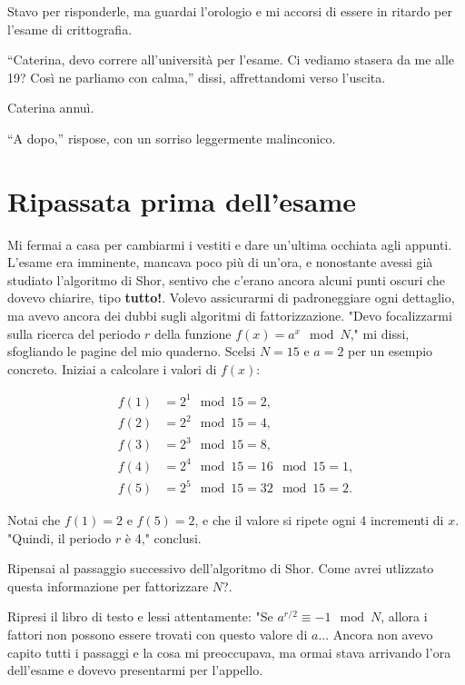 Stavo per risponderle, ma guardai l'orologio e mi accorsi di essere in ritardo per l’esame di crittografia.

\begin{dialogue}
 \enquote{Caterina, devo correre all’università per l'esame. Ci vediamo stasera da me alle 19? Così ne parliamo con calma,} dissi, affrettandomi verso l’uscita.
\end{dialogue}

Caterina annuì.

\begin{dialogue}
 \enquote{A dopo,} rispose, con un sorriso leggermente malinconico.
\end{dialogue}

\section{Ripassata prima dell'esame}

Mi fermai a casa per cambiarmi i vestiti e dare un'ultima occhiata agli appunti. L'esame era imminente, mancava poco più di un'ora, e nonostante avessi già studiato l'algoritmo di Shor, sentivo che c'erano ancora alcuni punti oscuri che dovevo chiarire, tipo \textbf{tutto!}. Volevo assicurarmi di padroneggiare ogni dettaglio, ma avevo ancora dei dubbi sugli algoritmi di fattorizzazione.
"Devo focalizzarmi sulla ricerca del periodo \( r \) della funzione \( f(x) = a^x \mod N \)," mi dissi, sfogliando le pagine del mio quaderno. Scelsi \( N = 15 \) e \( a = 2 \) per un esempio concreto. Iniziai a calcolare i valori di \( f(x) \):

\[
\begin{aligned}
f(1) &= 2^1 \mod 15 = 2, \\
f(2) &= 2^2 \mod 15 = 4, \\
f(3) &= 2^3 \mod 15 = 8, \\
f(4) &= 2^4 \mod 15 = 16 \mod 15 = 1, \\
f(5) &= 2^5 \mod 15 = 32 \mod 15 = 2.
\end{aligned}
\]

Notai che \( f(1) = 2 \) e \( f(5) = 2 \), e che il valore si ripete ogni 4 incrementi di \( x \). "Quindi, il periodo \( r \) è 4," conclusi.

Ripensai al passaggio successivo dell'algoritmo di Shor. Come avrei utlizzato questa informazione per fattorizzare $N$?.

Ripresi il libro di testo e lessi attentamente: "Se \( a^{r/2} \equiv -1 \mod N \), allora i fattori non possono essere trovati con questo valore di \( a \)... Ancora non avevo capito tutti i passaggi e la cosa mi preoccupava, ma ormai stava arrivando l'ora dell'esame e dovevo presentarmi per l'appello.


